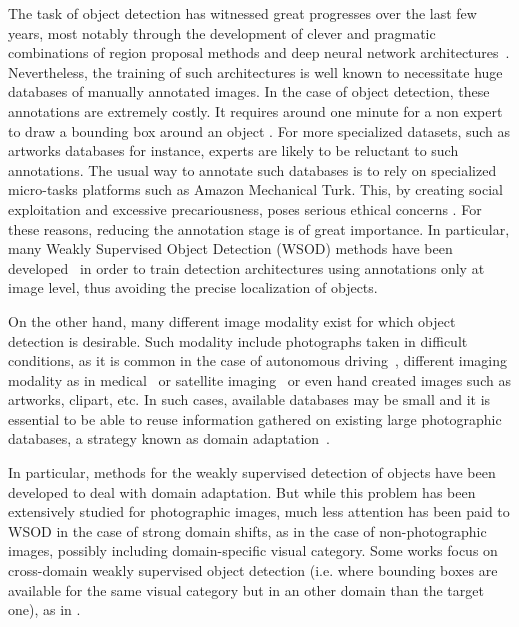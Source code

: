 \documentclass[preprint]{elsarticle}
\begin{document}
The task of object detection has witnessed great progresses over the last few years, most notably through the development of clever and pragmatic combinations of region proposal methods and deep neural network architectures~\citep{ren_faster_2015}. Nevertheless, the training of such architectures is well known to necessitate huge databases of manually annotated images. In the case of object detection, these annotations are extremely costly. It requires around one minute for a non expert to draw a bounding box around an object \citep{su_crowdsourcing_2016}. For more specialized datasets, such as artworks databases for instance, experts are likely to be reluctant to such annotations. The usual way to annotate such databases is to rely on specialized micro-tasks platforms such as Amazon Mechanical Turk. This, by creating social exploitation and excessive precariousness, poses serious ethical concerns \citep{tubaro_microwork_2019}. For these reasons, reducing the annotation stage is of great importance. In particular, many Weakly Supervised Object Detection (WSOD) methods have been developed~\citep{bilen_weakly_2016,zhu_soft_2017,tang_weakly_2018} in order to train detection architectures using annotations only at image level, thus avoiding the precise localization of objects. 

On the other hand, many different image modality exist for which object detection is desirable. Such modality include photographs taken in difficult conditions, as it is common in the case of autonomous driving~\citep{vu_advent_2019}, different imaging modality as in medical~\citep{yang_unsupervised_2019} or satellite imaging~\citep{li_adaptive_2018} or even hand created images such as artworks, clipart, etc. In such cases, available databases may be small and it is essential to be able to reuse information gathered on existing large photographic databases, a strategy known as domain adaptation~\citep{saenko_adapting_2010}. 


In particular, methods for the weakly supervised detection of objects have been developed to deal with domain adaptation. But while this problem has been extensively studied for photographic images, much less attention has been paid to WSOD in the case of strong domain shifts, as in the case of non-photographic images, possibly including domain-specific visual category. Some works focus on cross-domain weakly supervised object detection (i.e. where bounding boxes are available for the same visual category but in an other domain than the target one), as in \citep{inoue_crossdomain_2018,fu_deeply_2020}.
\end{document}

